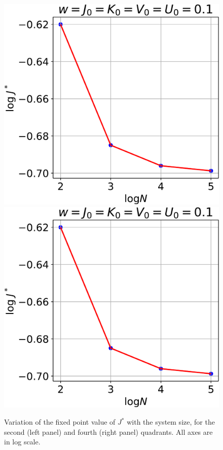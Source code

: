 \documentclass[12pt,twoside]{article}
\numberwithin{equation}{section}
\begin{document}
\begin{figure}[htpb!]
\centering
\includegraphics[scale=0.39]{../figures/J_vs_D_q2.pdf}
\includegraphics[scale=0.39]{../figures/J_vs_D_q4.pdf}
\caption{Variation of the fixed point value of $J^*$  with the system size, for the second (left panel) and fourth (right panel) quadrants. All axes are in log scale.}
\label{J_D_q24}
\end{figure}
\end{document}

